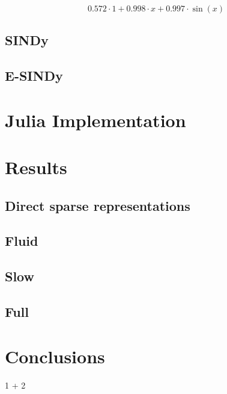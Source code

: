 \documentclass[
]{article}
\newenvironment{Shaded}{\begin{snugshade}}{\end{snugshade}}
\newcommand{\FloatTok}[1]{\textcolor[rgb]{0.68,0.00,0.00}{#1}}
\newcommand{\OperatorTok}[1]{\textcolor[rgb]{0.37,0.37,0.37}{#1}}
\begin{document}
\begin{equation} 0.572 \cdot 1 + 0.998 \cdot x + 0.997 \cdot \sin\left( x \right) \end{equation}

\subsection{SINDy}\label{sindy}

\subsection{E-SINDy}\label{e-sindy}

\section{Julia Implementation}\label{julia-implementation}

\section{Results}\label{results}

\subsection{Direct sparse
representations}\label{direct-sparse-representations}

\subsection{Fluid}\label{fluid}

\subsection{Slow}\label{slow}

\subsection{Full}\label{full}

\section{Conclusions}\label{conclusions}

\begin{Shaded}
\begin{Highlighting}[]
\FloatTok{1} \OperatorTok{+} \FloatTok{2}
\end{Highlighting}
\end{Shaded}
\end{document}
